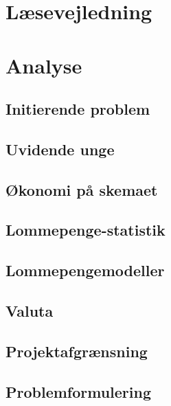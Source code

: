 \documentclass[12pt,a4paper]{report}
\begin{document}
%



\chapter{Læsevejledning}


\newpage
\thispagestyle{empty}
\mbox{}

\chapter{Analyse}

\section{Initierende problem}


\section{Uvidende unge}
\label{UvidendeUnge}


\section{Økonomi på skemaet}
\label{Okonomi}


\section{Lommepenge-statistik}
\label{LommeStat}


\section{Lommepengemodeller}
\label{LommeModeller}

%

\section{Valuta}
\label{Valuta}


\section{Projektafgrænsning}


\section{Problemformulering}



%

\newpage
\thispagestyle{empty}
\mbox{}



\end{document}
